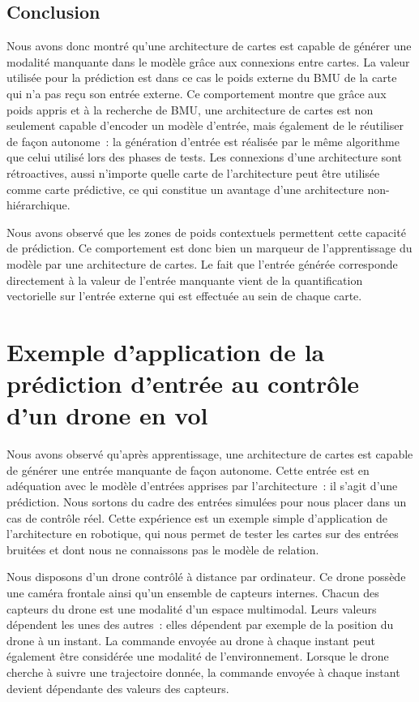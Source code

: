 \documentclass[../main]{subfiles}
\begin{document}
\subsection{Conclusion}

Nous avons donc montré qu'une architecture de cartes est capable de générer une modalité manquante dans le modèle grâce aux connexions entre cartes. La valeur utilisée pour la prédiction est dans ce cas le poids externe du BMU de la carte qui n'a pas reçu son entrée externe.
Ce comportement montre que grâce aux poids appris et à la recherche de BMU, une architecture de cartes est non seulement capable d'encoder un modèle d'entrée, mais également de le réutiliser de façon autonome~: la génération d'entrée est réalisée par le même algorithme que celui utilisé lors des phases de tests.
Les connexions d'une architecture sont rétroactives, aussi n'importe quelle carte de l'architecture peut être utilisée comme carte prédictive, ce qui constitue un avantage d'une architecture non-hiérarchique.

Nous avons observé que les zones de poids contextuels permettent cette capacité de prédiction. Ce comportement est donc bien un marqueur de l'apprentissage du modèle par une architecture de cartes. Le fait que l'entrée générée corresponde directement à la valeur de l'entrée manquante vient de la quantification vectorielle sur l'entrée externe qui est effectuée au sein de chaque carte.

\section{Exemple d'application de la prédiction d'entrée au contrôle d'un drone en vol}

Nous avons observé qu'après apprentissage, une architecture de cartes est capable de générer une entrée manquante de façon autonome. Cette entrée est en adéquation avec le modèle d'entrées apprises par l'architecture~: il s'agit d'une prédiction.
Nous sortons du cadre des entrées simulées pour nous placer dans un cas de contrôle réel.
Cette expérience est un exemple simple d'application de l'architecture en robotique, qui nous permet de tester les cartes sur des entrées bruitées et dont nous ne connaissons pas le modèle de relation.

Nous disposons d'un drone contrôlé à distance par ordinateur. 
Ce drone possède une caméra frontale ainsi qu'un ensemble de capteurs internes. Chacun des capteurs du drone est une modalité d'un espace multimodal. Leurs valeurs dépendent les unes des autres~: elles dépendent par exemple de la position du drone à un instant.
La commande envoyée au drone à chaque instant peut également être considérée une modalité de l'environnement. 
Lorsque le drone cherche à suivre une trajectoire donnée, la commande envoyée à chaque instant devient dépendante des valeurs des capteurs.
\end{document}

